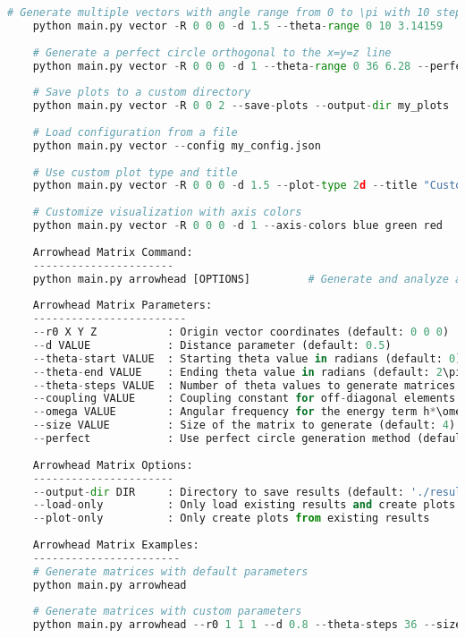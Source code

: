 \begin{lstlisting}[language=Python]
    # Generate multiple vectors with angle range from 0 to \pi with 10 steps
    python main.py vector -R 0 0 0 -d 1.5 --theta-range 0 10 3.14159
    
    # Generate a perfect circle orthogonal to the x=y=z line
    python main.py vector -R 0 0 0 -d 1 --theta-range 0 36 6.28 --perfect
    
    # Save plots to a custom directory
    python main.py vector -R 0 0 2 --save-plots --output-dir my_plots
    
    # Load configuration from a file
    python main.py vector --config my_config.json
    
    # Use custom plot type and title
    python main.py vector -R 0 0 0 -d 1.5 --plot-type 2d --title "Custom Plot Title"
    
    # Customize visualization with axis colors
    python main.py vector -R 0 0 0 -d 1 --axis-colors blue green red
    
    Arrowhead Matrix Command:
    ----------------------
    python main.py arrowhead [OPTIONS]         # Generate and analyze arrowhead matrices
    
    Arrowhead Matrix Parameters:
    ------------------------
    --r0 X Y Z           : Origin vector coordinates (default: 0 0 0)
    --d VALUE            : Distance parameter (default: 0.5)
    --theta-start VALUE  : Starting theta value in radians (default: 0)
    --theta-end VALUE    : Ending theta value in radians (default: 2\pi)
    --theta-steps VALUE  : Number of theta values to generate matrices for (default: 72)
    --coupling VALUE     : Coupling constant for off-diagonal elements (default: 0.1)
    --omega VALUE        : Angular frequency for the energy term h*\omega (default: 1.0)
    --size VALUE         : Size of the matrix to generate (default: 4)
    --perfect            : Use perfect circle generation method (default: True)
    
    Arrowhead Matrix Options:
    ----------------------
    --output-dir DIR     : Directory to save results (default: './results')
    --load-only          : Only load existing results and create plots
    --plot-only          : Only create plots from existing results
    
    Arrowhead Matrix Examples:
    -----------------------
    # Generate matrices with default parameters
    python main.py arrowhead
    
    # Generate matrices with custom parameters
    python main.py arrowhead --r0 1 1 1 --d 0.8 --theta-steps 36 --size 6
    

\end{lstlisting}

